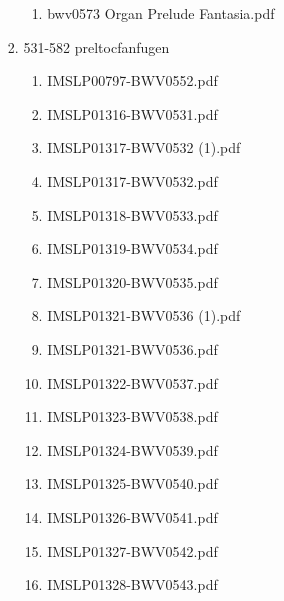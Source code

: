 \documentclass[11pt]{article}
\begin{document}
\begin{enumerate}
\begin{enumerate}
\begin{enumerate}
\begin{enumerate}
\item bwv0573   Organ Prelude Fantasia.pdf
\label{sec-1-1-1-1-44-6-4-1-3-37}
\end{enumerate}

\item 531-582 preltocfanfugen
\label{sec-1-1-1-1-44-6-4-1-4}
\begin{enumerate}
\item IMSLP00797-BWV0552.pdf
\label{sec-1-1-1-1-44-6-4-1-4-1}

\item IMSLP01316-BWV0531.pdf
\label{sec-1-1-1-1-44-6-4-1-4-2}

\item IMSLP01317-BWV0532 (1).pdf
\label{sec-1-1-1-1-44-6-4-1-4-3}

\item IMSLP01317-BWV0532.pdf
\label{sec-1-1-1-1-44-6-4-1-4-4}

\item IMSLP01318-BWV0533.pdf
\label{sec-1-1-1-1-44-6-4-1-4-5}

\item IMSLP01319-BWV0534.pdf
\label{sec-1-1-1-1-44-6-4-1-4-6}

\item IMSLP01320-BWV0535.pdf
\label{sec-1-1-1-1-44-6-4-1-4-7}

\item IMSLP01321-BWV0536 (1).pdf
\label{sec-1-1-1-1-44-6-4-1-4-8}

\item IMSLP01321-BWV0536.pdf
\label{sec-1-1-1-1-44-6-4-1-4-9}

\item IMSLP01322-BWV0537.pdf
\label{sec-1-1-1-1-44-6-4-1-4-10}

\item IMSLP01323-BWV0538.pdf
\label{sec-1-1-1-1-44-6-4-1-4-11}

\item IMSLP01324-BWV0539.pdf
\label{sec-1-1-1-1-44-6-4-1-4-12}

\item IMSLP01325-BWV0540.pdf
\label{sec-1-1-1-1-44-6-4-1-4-13}

\item IMSLP01326-BWV0541.pdf
\label{sec-1-1-1-1-44-6-4-1-4-14}

\item IMSLP01327-BWV0542.pdf
\label{sec-1-1-1-1-44-6-4-1-4-15}

\item IMSLP01328-BWV0543.pdf
\label{sec-1-1-1-1-44-6-4-1-4-16}


\end{enumerate}
\end{enumerate}
\end{enumerate}
\end{enumerate}
\end{document}
